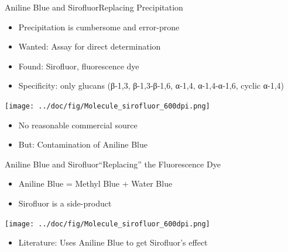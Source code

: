 \documentclass[mathserif]{beamer}
\begin{document}
\begin{frame}{Aniline Blue and Sirofluor}{Replacing Precipitation}
	\begin{itemize}
		\item Precipitation is cumbersome and error-prone
		\pause
		\item Wanted: Assay for direct determination
		\pause
		\item Found: Sirofluor, fluorescence dye
		\item Specificity: only glucans (β-1,3, β-1,3-β-1,6, α-1,4, α-1,4-α-1,6, cyclic α-1,4)
	\end{itemize}
	\pause
	\begin{center}
		\texttt{[image: ../doc/fig/Molecule\_sirofluor\_600dpi.png]}
	\end{center}
	\pause
	\begin{itemize}
		\item No reasonable commercial source
		\pause
		\item But: Contamination of Aniline Blue
	\end{itemize}
\end{frame}

\begin{frame}{Aniline Blue and Sirofluor}{\enquote{Replacing} the Fluorescence Dye}
	\begin{itemize}
		\item Aniline Blue = Methyl Blue + Water Blue
		\pause
	\end{itemize}
	\begin{center}
	\end{center}
	\begin{itemize}
		\pause
		\item Sirofluor is a side-product
	\end{itemize}
	\begin{center}
		\texttt{[image: ../doc/fig/Molecule\_sirofluor\_600dpi.png]}
	\end{center}
	\pause
	\begin{itemize}
		\item Literature: Uses Aniline Blue to get Sirofluor's effect
	\end{itemize}
\end{frame}
\end{document}

